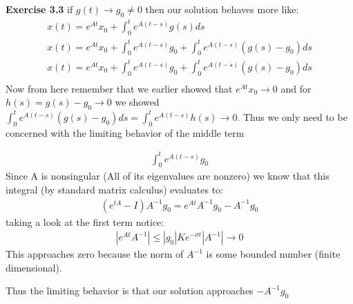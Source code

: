 \documentclass[12pt]{article}
\newenvironment{exercise}[1]{\vspace{.1in}\noindent\textbf{Exercise #1 \hspace{.05em}}}{}
\theoremstyle{definition}
\theoremstyle{remark}
\begin{document}
\begin{exercise}{3.3}
	if $g(t)\rightarrow g_0\neq 0$ then our solution behaves more like:
	\begin{align}
		x(t)=e^{At}x_0+\int_0^te^{A(t-s)}g(s)ds                             \\
		x(t)=e^{At}x_0+\int_0^te^{A(t-s)}g_0+\int_0^te^{A(t-s)}(g(s)-g_0)ds \\
		x(t)=e^{At}x_0+\int_0^te^{A(t-s)}g_0+\int_0^te^{A(t-s)}(g(s)-g_0)ds \\
	\end{align}
	Now from here remember that we earlier showed that $e^{At}x_0\rightarrow 0$ and for $h(s)=g(s)-g_0\rightarrow 0$ we showed $\int_0^te^{A(t-s)}(g(s)-g_0)ds=\int_0^te^{A(t-s)}h(s)\rightarrow 0 $. Thus we only need to be concerned with the limiting behavior of the middle term

	\begin{align}
		\int_0^te^{A(t-s)}g_0
	\end{align}
	Since A is nonsingular (All of its eigenvalues are nonzero) we know that this integral (by standard matrix calculus) evaluates to:
	\begin{align}
		(e^{tA}-I)A^{-1}g_0 = e^{At}A^{-1}g_0-A^{-1}g_0
	\end{align}
	taking a look at the first term notice:
	\begin{align}
		|e^{At}A^{-1}|\leq |g_0|Ke^{-\sigma t}|A^{-1}|\rightarrow 0
	\end{align}
	This approaches zero because the norm of $A^{-1}$ is some bounded number (finite dimensional).

	Thus the limiting behavior is that our solution approaches $-A^{-1}g_0$
\end{exercise}
\end{document}
